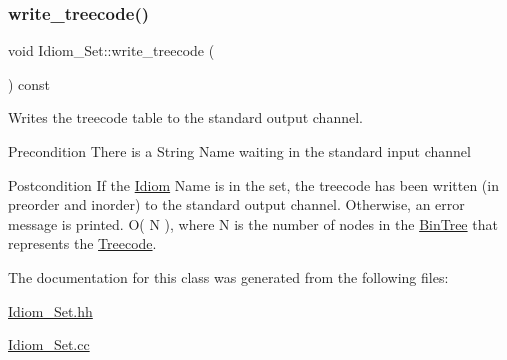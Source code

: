 \subsubsection{\texorpdfstring{write\+\_\+treecode()}{write\_treecode()}}
{\footnotesize\ttfamily void Idiom\+\_\+\+Set\+::write\+\_\+treecode (\begin{DoxyParamCaption}{ }\end{DoxyParamCaption}) const}



Writes the treecode table to the standard output channel. 

\begin{DoxyPrecond}{Precondition}
There is a String Name waiting in the standard input channel 
\end{DoxyPrecond}
\begin{DoxyPostcond}{Postcondition}
If the \hyperlink{classIdiom}{Idiom} Name is in the set, the treecode has been written (in preorder and inorder) to the standard output channel. Otherwise, an error message is printed.  O( N ), where N is the number of nodes in the \hyperlink{classBinTree}{Bin\+Tree} that represents the \hyperlink{classTreecode}{Treecode}. 
\end{DoxyPostcond}


The documentation for this class was generated from the following files\+:\begin{DoxyCompactItemize}
\item 
\hyperlink{Idiom__Set_8hh}{Idiom\+\_\+\+Set.\+hh}\item 
\hyperlink{Idiom__Set_8cc}{Idiom\+\_\+\+Set.\+cc}\end{DoxyCompactItemize}
